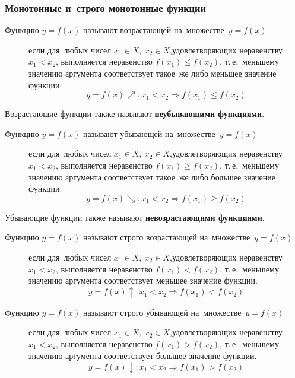 \documentclass[]{scrartcl}
\begin{document}
\subsubsection{Монотонные и~строго монотонные функции}
\begin{description}
	\item[Функцию ${\textstyle y=f(x)}$ называют возрастающей на~множестве~${\textstyle y=f(x)}$] если для~любых чисел ${\textstyle x_1 \in X,\ x_2 \in X}$,удовлетворяющих неравенству ${\textstyle x_1 < x_2}$, выполняется неравенство ${\textstyle f(x_1) \leq f(x_2)}$, т.\,е.~меньшему значению аргумента соответствует такое~же либо меньшее значение функции.
	\begin{equation}\label{eq:function-6}
	y=f(x)\nearrow :x_1 < x_2 \Rightarrow f(x_1) \leq f(x_2)
	\end{equation}
\end{description}
Возрастающие функции также называют \textbf{неубывающими функциями}.
\begin{description}
	\item[Функцию ${\textstyle y=f(x)}$ называют убывающей на~множестве~${\textstyle y=f(x)}$] если для~любых чисел ${\textstyle x_1 \in X,\ x_2 \in X}$,удовлетворяющих неравенству ${\textstyle x_1 < x_2}$, выполняется неравенство ${\textstyle f(x_1) \geq f(x_2)}$, т.\,е.~меньшему значению аргумента соответствует такое~же либо большее значение функции.
	\begin{equation}\label{eq:function-7}
	y=f(x)\searrow :x_1 < x_2 \Rightarrow f(x_1) \geq f(x_2)
	\end{equation}
\end{description}
Убывающие функции также называют \textbf{невозрастающими функциями}.
\begin{description}
	\item[Функцию ${\textstyle y=f(x)}$ называют строго возрастающей на~множестве~${\textstyle y=f(x)}$] если для~любых чисел ${\textstyle x_1 \in X,\ x_2 \in X}$,удовлетворяющих неравенству ${\textstyle x_1 < x_2}$, выполняется неравенство ${\textstyle f(x_1) < f(x_2)}$, т.\,е.~меньшему значению аргумента соответствует меньшее значение функции.
	\begin{equation}\label{eq:function-8}
	y=f(x)\uparrow :x_1 < x_2 \Rightarrow f(x_1) < f(x_2)
	\end{equation}
\end{description}
\begin{description}
	\item[Функцию ${\textstyle y=f(x)}$ называют строго убывающей на~множестве~${\textstyle y=f(x)}$] если для~любых чисел ${\textstyle x_1 \in X,\ x_2 \in X}$,удовлетворяющих неравенству ${\textstyle x_1 < x_2}$, выполняется неравенство ${\textstyle f(x_1) > f(x_2)}$, т.\,е.~меньшему значению аргумента соответствует большее значение функции.
	\begin{equation}\label{eq:function-9}
	y=f(x)\downarrow :x_1 < x_2 \Rightarrow f(x_1) > f(x_2)
	\end{equation}
\end{description}
\end{document}
